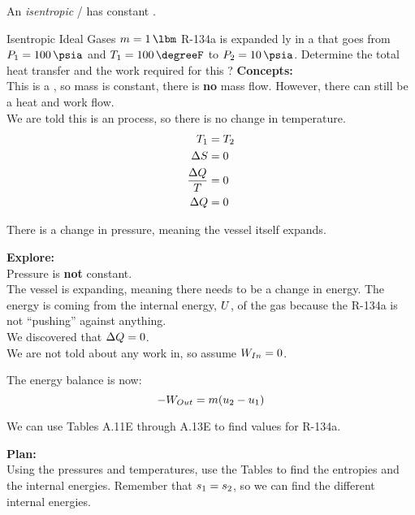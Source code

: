 \begin{definition}[Isentropic]\label{def:Isentropic}
  An \emph{isentropic} / has constant .
\end{definition}

\begin{example}{Isentropic Ideal Gases}
  $\Mass = \SI{1}{\lbm}$ R-134a is expanded ly in a  that goes from $\Pressure_{1} = \SI{100}{\psia}$ and $\Temp_{1} = \SI{100}{\degreeF}$ to $\Pressure_{2} = \SI{10}{\psia}$.
  Determine the total heat transfer and the work required for this ?
  \tcblower{}
  \textbf{Concepts:} \\
  This is a , so mass is constant, there is \textbf{no} mass flow.
  However, there can still be a heat and work flow. \\
  We are told this is an  process, so there is no change in temperature.
  \begin{align*}
    T_{1} &= T_{2} \\
    \Delta S &= 0 \\
    \frac{\Delta Q}{T} &= 0 \\
    \Delta Q &= 0
  \end{align*}

  There is a change in pressure, meaning the vessel itself expands.

  \textbf{Explore:} \\
  Pressure is \textbf{not} constant. \\
  The vessel is expanding, meaning there needs to be a change in energy.
  The energy is coming from the internal energy, $U$, of the gas because the R-134a is not ``pushing'' against anything. \\
  We discovered that $\Delta Q = 0$. \\
  We are not told about any work in, so assume $W_{In} = 0$.

  The energy balance is now:
  \begin{equation*}
    -W_{Out} = m (u_{2} - u_{1}) \\
  \end{equation*}

  We can use Tables A.11E through A.13E to find values for R-134a.

  \textbf{Plan:} \\
  Using the pressures and temperatures, use the Tables to find the entropies and the internal energies.
  Remember that $s_{1} = s_{2}$, so we can find the different internal energies.


\end{example}
